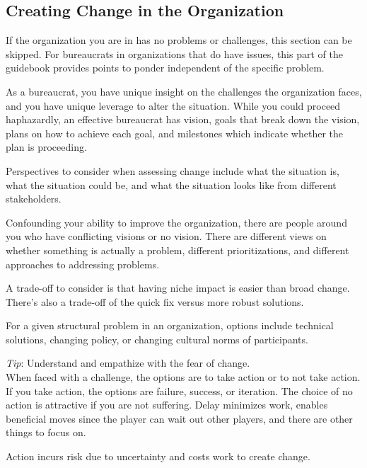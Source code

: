 \subsection*{Creating Change in the Organization\label{sec:creating-change}}

If the organization you are in has no problems or challenges, this section can be skipped. For bureaucrats in organizations that do have issues, this part of the guidebook provides points to ponder independent of the specific problem.

As a bureaucrat, you have unique insight on the challenges the organization faces, and you have unique leverage to alter the situation.  While you could proceed haphazardly, an effective bureaucrat has vision, goals that break down the vision, plans on how to achieve each goal, and milestones which indicate whether the plan is proceeding. 

Perspectives to consider when assessing change include what the situation is, what the situation could be, and what the situation looks like from different stakeholders.

Confounding your ability to improve the organization, there are people around you who have conflicting visions or no vision. There are different views on whether something is actually a problem, different prioritizations, and different approaches to addressing problems.

A trade-off to consider is that having niche impact is easier than broad change. There's also a trade-off of the quick fix versus more robust solutions.

For a given structural problem in an organization, options include technical solutions, changing policy, or changing cultural norms of participants.



\textit{Tip}: Understand and empathize with the fear of change. \\

When faced with a challenge, the options are to take action or to not take action. If you take action, the options are failure, success, or iteration. 
The choice of no action is attractive if you are not suffering. Delay minimizes work, enables beneficial moves since the player can wait out other players, and there are other things to focus on.

Action incurs risk due to uncertainty and costs work to create change.

